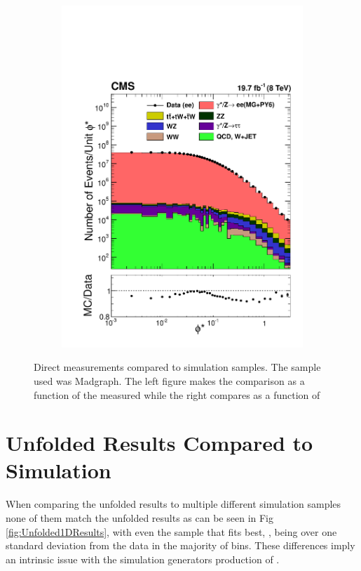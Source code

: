 \begin{figure}
\begin{subfigure}[b]{0.49\textwidth}
    \includegraphics[width=\linewidth]{figures/Results/MADGRAPHphistar.pdf}
    \caption{}
     \label{fig:DirectResultsPhistar}
    \end{subfigure} 
    \caption{Direct measurements compared to simulation samples. The \Ztoee sample used was Madgraph. The left figure makes the comparison as a function of the measured \bosonpt while the right compares as a function of \phistar}
    \label{fig:DirectResults}
\end{figure}

\section{Unfolded Results Compared to Simulation}
When comparing the unfolded results to multiple different simulation samples none of them match the unfolded results as can be seen in Fig \ref{fig:Unfolded1DResults}, with even the sample that fits best, \MADGRAPH, being over one standard deviation from the data in the majority of bins. These differences imply an intrinsic issue with the simulation generators production of \Z \bosonpt. 

